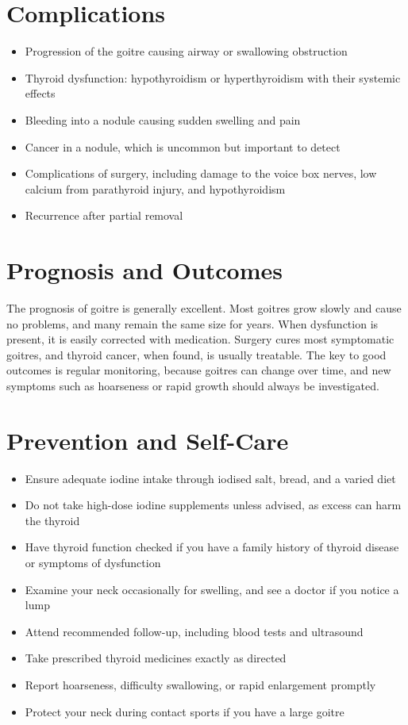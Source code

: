\section*{Complications}
\begin{itemize}
    \item Progression of the goitre causing airway or swallowing obstruction
    \item Thyroid dysfunction: hypothyroidism or hyperthyroidism with their systemic effects
    \item Bleeding into a nodule causing sudden swelling and pain
    \item Cancer in a nodule, which is uncommon but important to detect
    \item Complications of surgery, including damage to the voice box nerves, low calcium from parathyroid injury, and hypothyroidism
    \item Recurrence after partial removal
\end{itemize}

\section*{Prognosis and Outcomes}
The prognosis of goitre is generally excellent. Most goitres grow slowly and cause no problems, and many remain the same size for years. When dysfunction is present, it is easily corrected with medication. Surgery cures most symptomatic goitres, and thyroid cancer, when found, is usually treatable. The key to good outcomes is regular monitoring, because goitres can change over time, and new symptoms such as hoarseness or rapid growth should always be investigated.

\section*{Prevention and Self-Care}
\begin{itemize}
    \item Ensure adequate iodine intake through iodised salt, bread, and a varied diet
    \item Do not take high-dose iodine supplements unless advised, as excess can harm the thyroid
    \item Have thyroid function checked if you have a family history of thyroid disease or symptoms of dysfunction
    \item Examine your neck occasionally for swelling, and see a doctor if you notice a lump
    \item Attend recommended follow-up, including blood tests and ultrasound
    \item Take prescribed thyroid medicines exactly as directed
    \item Report hoarseness, difficulty swallowing, or rapid enlargement promptly
    \item Protect your neck during contact sports if you have a large goitre
\end{itemize}

